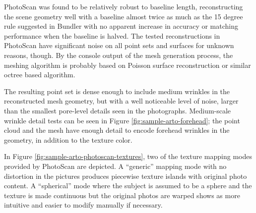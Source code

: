 PhotoScan was found to be relatively robust to baseline length, reconstructing the scene geometry well with a baseline almost twice as much as the 15 degree rule suggested in Bundler with no apparent increase in accuracy or matching performance when the baseline is halved.
The tested reconstructions in PhotoScan have significant noise on all point sets and surfaces for unknown reasons, though.
By the console output of the mesh generation process, the meshing algorithm is probably based on Poisson surface reconstruction or similar octree based algorithm.

The resulting point set is dense enough to include medium wrinkles in the reconstructed mesh geometry, but with a well noticeable level of noise, larger than the smallest pore-level details seen in the photographs.
Medium-scale wrinkle detail tests can be seen in Figure \ref{fig:sample-arto-forehead}; the point cloud and the mesh have enough detail to encode forehead wrinkles in the geometry, in addition to the texture color.

In Figure \ref{fig:sample-arto-photoscan-textures}, two of the texture mapping modes provided by PhotoScan are depicted.
A ``generic'' mapping mode with no distortion in the pictures produces piecewise texture islands with original photo content.
A ``spherical'' mode where the subject is assumed to be a sphere and the texture is made continuous but the original photos are warped shows as more intuitive and easier to modify manually if necessary.




